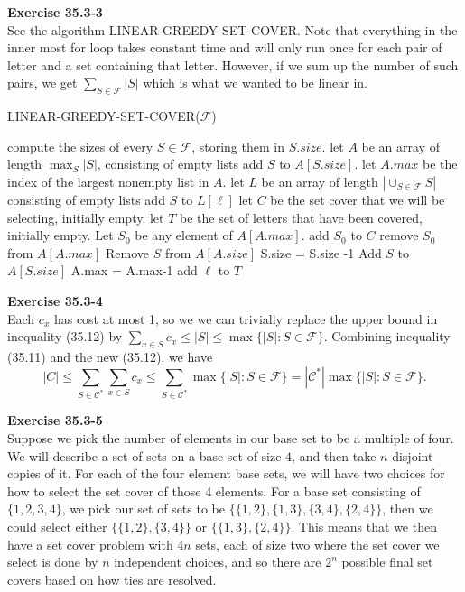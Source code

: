 \documentclass{article}
\begin{document}
\noindent\textbf{Exercise 35.3-3}\\

See the algorithm LINEAR-GREEDY-SET-COVER. Note that everything in the inner most for loop takes constant time and will only run once for each pair of letter and a set containing that letter. However, if we sum up the number of such pairs, we get $\sum_{S\in\mathcal{F}} |S|$ which is what we wanted to be linear in.

\begin{algorithm}
\caption{LINEAR-GREEDY-SET-COVER($\mathcal{F}$)}
\begin{algorithmic}
\State compute the sizes of every $S\in \mathcal{F}$, storing them in $S.size$.
\State let $A$ be an array of length $\max_S |S|$, consisting of empty lists
\State add $S$ to $A[S.size]$.
\EndFor
\State let $A.max$ be the index of the largest nonempty list in $A$.
\State let $L$ be an array of length $|\cup_{S\in\mathcal{F}} S|$ consisting of empty lists
\State add $S$ to $L[\ell]$
\EndFor
\EndFor
\State let $C$ be the set cover that we will be selecting, initially empty.
\State let $T$ be the set of letters that have been covered, initially empty.
\State Let $S_0$ be any element of $A[A.max]$.
\State add $S_0$ to $C$
\State remove $S_0$ from $A[A.max]$
\State Remove $S$ from $A[A.size]$
\State S.size = S.size -1
\State Add $S$ to $A[S.size]$
\State A.max = A.max-1
\EndIf
\EndFor
\State add $\ell$ to $T$
\EndFor
\EndWhile
\end{algorithmic}
\end{algorithm}

\noindent\textbf{Exercise 35.3-4}\\

Each $c_x$ has cost at most 1, so we we can trivially replace the upper bound in inequality (35.12) by $\sum_{x \in S} c_x \leq |S| \leq \max\{|S| : S \in \mathscr{F}\}$.  Combining inequality (35.11) and the new (35.12), we have
\[ |C| \leq \sum_{S \in \mathcal{C}^*} \sum_{x \in S} c_x \leq \sum_{S \in \mathcal{C}^*} \max\{|S| : S \in \mathscr{F}\} = |\mathcal{C}^*|\max\{|S| : S \in \mathscr{F}\}.\]

\noindent\textbf{Exercise 35.3-5}\\

Suppose we pick the number of elements in our base set to be a multiple of four. We will describe a set of sets on a base set of size $4$, and then take $n$ disjoint copies of it. For each of the four element base sets, we will have two choices for how to select the set cover of those 4 elements. For a base set consisting of $\{1,2,3,4\}$, we pick our set of sets to be $\{ \{1,2\},\{1,3\},\{3,4\},\{2,4\}\}$, then we could select either $\{\{1,2\},\{3,4\}\}$ or $\{\{1,3\},\{2,4\}\}$. This means that we then have a set cover problem with $4n$ sets, each of size two where the set cover we select is done by $n$ independent choices, and so there are $2^n$ possible final set covers based on how ties are resolved.\\
\end{document}
